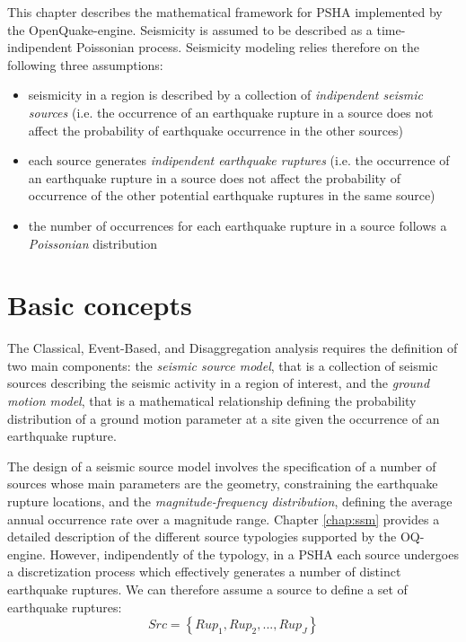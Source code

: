 This chapter describes the mathematical framework for PSHA implemented by the OpenQuake-engine.
Seismicity is assumed to be described as a time-indipendent Poissonian process. Seismicity modeling
relies therefore on the following three assumptions:
\begin{itemize}
	\item seismicity in a region is described by a collection of \textit{indipendent seismic sources}
	(i.e. the occurrence of an earthquake rupture in a source does not affect the probability of
	earthquake occurrence in the other sources)
	\item each source generates \textit{indipendent earthquake ruptures} (i.e. the occurrence of an
	earthquake rupture in a source does not affect the probability of occurrence of the other
	potential earthquake ruptures in the same source)
	\item the number of occurrences for each earthquake rupture in a source follows a \textit{Poissonian}
	distribution
\end{itemize}

\section{Basic concepts}
The Classical, Event-Based, and Disaggregation analysis requires the definition of two main components:
the \textit{seismic source model}, that is a collection of seismic sources describing the seismic activity in a
region of interest, and the \textit{ground motion model}, that is a mathematical relationship defining the
probability distribution of a ground motion parameter at a site given the occurrence of an earthquake
rupture.

The design of a seismic source model involves the specification of a number of sources whose main parameters
are the geometry, constraining the earthquake rupture locations, and the \textit{magnitude-frequency
distribution}, defining the average annual occurrence rate over a magnitude range. Chapter \ref{chap:ssm} provides
a detailed description of the different source typologies supported by the OQ-engine. However, indipendently
of the typology, in a PSHA each source undergoes a discretization process which effectively generates a
number of distinct earthquake ruptures. We can therefore assume a source to define a set of earthquake ruptures:
\begin{equation}
Src = \left\{Rup_{1}, Rup_{2}, ..., Rup_{J}\right\}
\end{equation}

